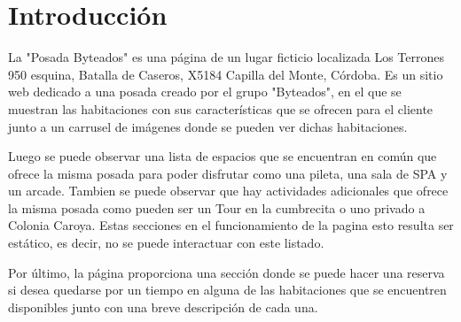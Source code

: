 \section{Introducción}

La "Posada Byteados" es una página de un lugar ficticio localizada Los Terrones 950 esquina, Batalla de Caseros, X5184 Capilla del Monte, Córdoba. Es un sitio web dedicado a una posada creado por el grupo "Byteados", en el que se muestran las habitaciones con sus características que se ofrecen para el cliente junto a un carrusel de imágenes donde se pueden ver dichas habitaciones. 

Luego se puede observar una lista de espacios que se encuentran en común que ofrece la misma posada para poder disfrutar como una pileta, una sala de SPA y un arcade. Tambien se puede observar que hay actividades adicionales que ofrece la misma posada como pueden ser un Tour en la cumbrecita o uno privado a Colonia Caroya. Estas secciones en el funcionamiento de la pagina esto resulta ser estático, es decir, no se puede interactuar con este listado. 


Por último, la página proporciona una sección donde se puede hacer una reserva si desea quedarse por un tiempo en alguna de las habitaciones que se encuentren disponibles junto con una breve descripción de cada una.
